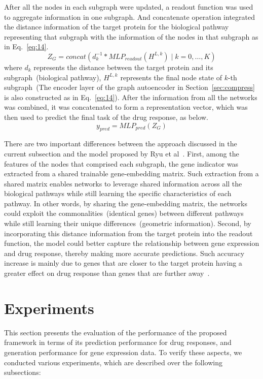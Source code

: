 \documentclass[runningheads]{llncs}
\begin{document}
After all the nodes in each subgraph were updated, a readout function
was used to aggregate information in one subgraph. And concatenate
operation integrated the distance information of the target protein
for the biological pathway representing that subgraph with the
information of the nodes in that subgraph as in Eq.~\eqref{eq:14}.
%
\begin{equation}\label{eq:13}
Z_{G} = concat(d_k^{-1} * MLP_{readout}(H^{L, k}) \; |  \; k = 0, \ldots, K)
\end{equation}
%
where $d_k$ represents the distance between the target protein and its
subgraph~(biological pathway), $H^{L, k}$ represents the final node state
of $k$-th subgraph~(The encoder layer of the graph autoencoder in Section~\ref{sec:compress} is also constructed as in Eq.~\eqref{eq:14}). After the information from all the networks was combined, it was concatenated to form a representation vector, which was then used to predict the final task of the drug response, as below.
%
\begin{equation}\label{eq:14}
y_{pred} = MLP_{pred}(Z_G)
\end{equation}

There are two important differences between the approach discussed in
the current subsection and the model proposed by Ryu et al~\cite{28}. First,
among the features of the nodes that comprised each subgraph, the gene
indicator was extracted from a shared trainable gene-embedding
matrix. Such extraction from a shared matrix enables networks to leverage
shared information across all the biological pathways while still
learning the specific characteristics of each pathway. In other words,
by sharing the gene-embedding matrix, the networks could exploit the
commonalities~(identical genes) between different pathways while still
learning their unique differences~(geometric information). Second, by
incorporating this distance information from the target protein into
the readout function, the model could better capture the relationship
between gene expression and drug response, thereby making more
accurate predictions. Such accuracy increase is mainly due to genes that are closer to the target protein having a greater effect on drug response than genes that are further away~\cite{14}.


\section{Experiments}\label{sec:experiments}

This section presents the evaluation of the performance of the
proposed framework in terms of its prediction performance for drug
responses, and generation performance for gene expression data. To
verify these aspects, we conducted various experiments, which are
described over the following subsections:
\end{document}
